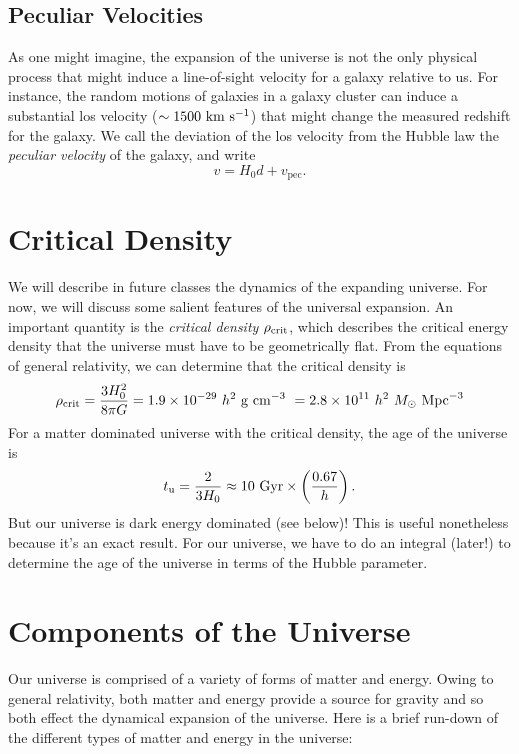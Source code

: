 \documentclass[]{article}
\begin{document}
\subsection{Peculiar Velocities}

As one might imagine, the expansion of the universe is not the only physical
process that might induce a line-of-sight velocity for a galaxy relative to
us. For instance, the random motions of galaxies in a galaxy cluster can induce a
substantial los velocity ($\sim1500~\mathrm{km}~\mathrm{s}^{-1}$) that might change the measured
redshift for the galaxy. We call the deviation of the los velocity from the
Hubble law the {\it peculiar velocity} of the galaxy, and write
\begin{equation}
v = H_0 d + v_{\mathrm{pec}}.
\end{equation}

\section{Critical Density}

We will describe in future classes the dynamics of the expanding universe.
For now, we will discuss some salient features of the universal expansion. An
important quantity is the {\it critical density} $\rho_{\mathrm{crit}}$, which describes the
critical energy density that the universe must have to be geometrically flat.
From the equations of general relativity, we can determine that the critical density is
\begin{equation}
\rho_{\mathrm{crit}} = \frac{3 H_0^2}{8\pi G} = 1.9\times10^{-29}~h^2~\mathrm{g}~\mathrm{cm}^{-3}~=2.8\times10^{11}~h^2~M_{\odot}~\mathrm{Mpc}^{-3}
\end{equation}
\noindent
For a matter dominated universe with the critical density, the age of the universe is
\begin{equation}
t_{\mathrm{u}} = \frac{2}{3H_0} \approx 10~\mathrm{Gyr} \times \left(\frac{0.67}{h}\right).
\end{equation}
\noindent
But our universe is dark energy dominated (see below)! 
This is useful nonetheless because it's an
exact result.  For our universe, we have to do an integral (later!) to determine the
age of the universe in terms of the Hubble parameter.

\section{Components of the Universe}

Our universe is comprised of a variety of forms of matter and energy.  Owing to
general relativity, both matter and energy provide a source for gravity and so
both effect the dynamical expansion of the universe.  Here is a brief run-down
of the different types of matter and energy in the universe:
\end{document}
